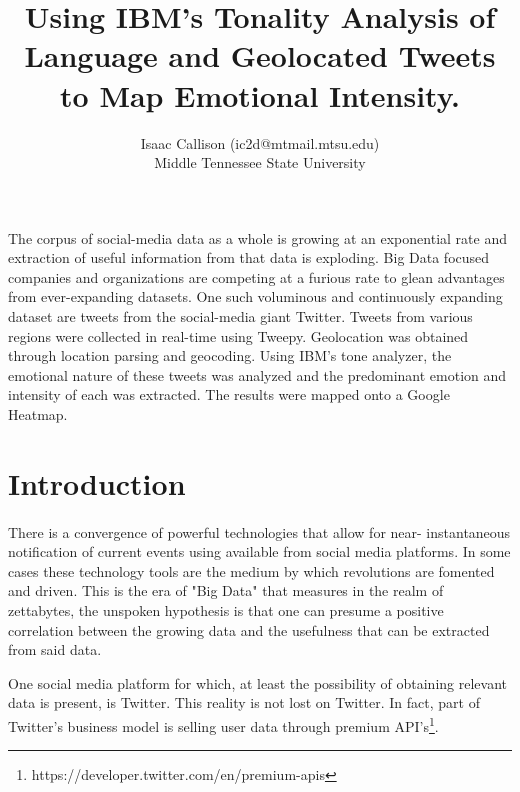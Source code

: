 \documentclass[12pt, oneside]{article}
\title{Using IBM's Tonality Analysis of Language and Geolocated Tweets to Map Emotional Intensity.
\\\medskip}
\author{Isaac Callison (ic2d@mtmail.mtsu.edu)\\Middle Tennessee State University}
\begin{document}
\maketitle
\nocite{*}
\newpage{}


\renewenvironment{abstract}
 {\small
  \begin{center}
  \bfseries \abstractname\vspace{-.5em}\vspace{0pt}
  \end{center}
  \list{}{
    \setlength{\leftmargin}{.8cm}%
    \setlength{\rightmargin}{\leftmargin}%
  }%
  \item\relax}
 {\endlist}

\begin{abstract}
The corpus of social-media data as a whole is growing at an exponential rate
and extraction of useful information from that data is exploding.
Big Data focused companies and organizations are competing at a furious rate to
glean advantages from ever-expanding datasets. One such voluminous and
continuously expanding dataset are tweets from the social-media giant Twitter.
Tweets from various regions were collected in real-time using Tweepy.
Geolocation was obtained through location parsing and geocoding. Using IBM's
tone analyzer, the emotional nature of these tweets was analyzed and the
predominant emotion and intensity of each was extracted. The results were mapped onto a
Google Heatmap.
\end{abstract}

\section{Introduction}
\paragraph{}
There is a convergence of powerful technologies that allow for near-
instantaneous notification of current events using available from
social media platforms. In some cases these technology tools are the medium by
which revolutions are fomented and driven\cite{arab}. This is the era of "Big
Data" that measures in the realm of zettabytes, the unspoken hypothesis is that
one can presume a positive correlation between the growing data and the
usefulness that can be extracted from said data\cite{villars2011}.

One social media platform for which, at least the possibility of obtaining
relevant data is present, is Twitter. This reality is not lost
on Twitter. In fact, part of Twitter's business model is selling user data
through premium API's\footnote{https://developer.twitter.com/en/premium-apis}.
\end{document}
